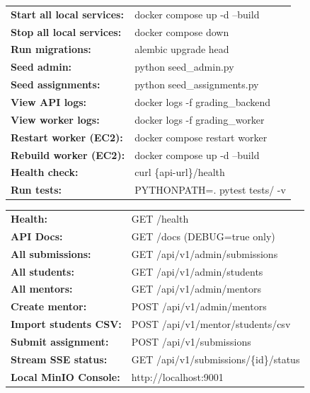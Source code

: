 \documentclass[12pt,a4paper]{article}
\begin{document}
\begin{tcolorbox}[colback=codebg, colframe=setupGreen,
  title={\color{setupGreen}\faTerminal\enspace Essential Commands}, fonttitle=\bfseries\color{setupGreen}]
\color{codetext}\ttfamily\small
\begin{tabular}{ll}
\textbf{Start all local services:}   & docker compose up -d --build \\
\textbf{Stop all local services:}    & docker compose down \\
\textbf{Run migrations:}             & alembic upgrade head \\
\textbf{Seed admin:}                 & python seed\_admin.py \\
\textbf{Seed assignments:}           & python seed\_assignments.py \\
\textbf{View API logs:}              & docker logs -f grading\_backend \\
\textbf{View worker logs:}           & docker logs -f grading\_worker \\
\textbf{Restart worker (EC2):}       & docker compose restart worker \\
\textbf{Rebuild worker (EC2):}       & docker compose up -d --build \\
\textbf{Health check:}               & curl \{api-url\}/health \\
\textbf{Run tests:}                  & PYTHONPATH=. pytest tests/ -v \\
\end{tabular}
\end{tcolorbox}

\vspace{1em}

\begin{tcolorbox}[colback=lightgray, colframe=setupCyan, title={\faLink\enspace Key URLs \& Endpoints}, fonttitle=\bfseries]
\begin{tabular}{ll}
\textbf{Health:}              & GET /health \\
\textbf{API Docs:}            & GET /docs (DEBUG=true only) \\
\textbf{All submissions:}     & GET /api/v1/admin/submissions \\
\textbf{All students:}        & GET /api/v1/admin/students \\
\textbf{All mentors:}         & GET /api/v1/admin/mentors \\
\textbf{Create mentor:}       & POST /api/v1/admin/mentors \\
\textbf{Import students CSV:} & POST /api/v1/mentor/students/csv \\
\textbf{Submit assignment:}   & POST /api/v1/submissions \\
\textbf{Stream SSE status:}   & GET /api/v1/submissions/\{id\}/status \\
\textbf{Local MinIO Console:} & http://localhost:9001 \\
\end{tabular}
\end{tcolorbox}

\end{document}
